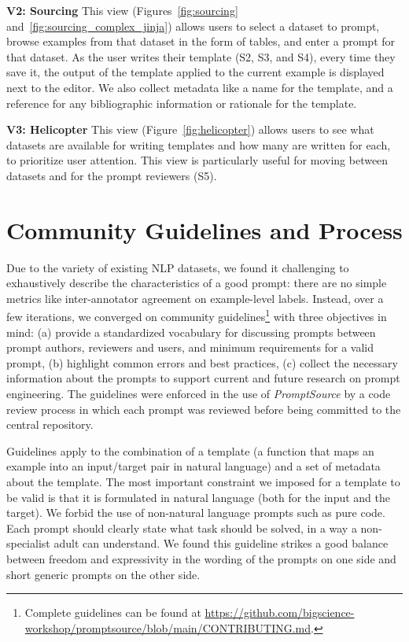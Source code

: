 \textbf{V2: Sourcing} This view (Figures~\ref{fig:sourcing} and~\ref{fig:sourcing_complex_jinja}) allows users to select a dataset to prompt, browse examples from that dataset in the form of tables, and enter a prompt for that dataset. As the user writes their template (S2, S3, and S4), every time they save it, the output of the template applied to the current example is displayed next to the editor. We also collect metadata like a name for the template, and a reference for any bibliographic information or rationale for the template.

\textbf{V3: Helicopter} This view (Figure~\ref{fig:helicopter}) allows users to see what datasets are available for writing templates and how many are written for each, to prioritize user attention. This view is particularly useful for moving between datasets and for the prompt reviewers (S5).

\section{Community Guidelines and Process}
\label{sec:contrib}

Due to the variety of existing NLP datasets, we found it challenging to exhaustively describe the characteristics of a good prompt: there are no simple metrics like inter-annotator agreement on example-level labels. Instead, over a few iterations, we converged on community guidelines\footnote{Complete guidelines can be found at \url{https://github.com/bigscience-workshop/promptsource/blob/main/CONTRIBUTING.md}.} with three objectives in mind: (a) provide a standardized vocabulary for discussing prompts between prompt authors, reviewers and users, and minimum requirements for a valid prompt, (b) highlight common errors and best practices, (c) collect the necessary information about the prompts to support current and future research on prompt engineering. The guidelines were enforced in the use of \textit{PromptSource} by a code review process in which each prompt was reviewed before being committed to the central repository.

Guidelines apply to the combination of a template (a function that maps an example into an input/target pair in natural language) and a set of metadata about the template. The most important constraint we imposed for a template to be valid is that it is formulated in natural language (both for the input and the target). We forbid the use of non-natural language prompts such as pure code. Each prompt should clearly state what task should be solved, in a way a non-specialist adult can understand. We found this guideline strikes a good balance between freedom and expressivity in the wording of the prompts on one side and short generic prompts on the other side.

